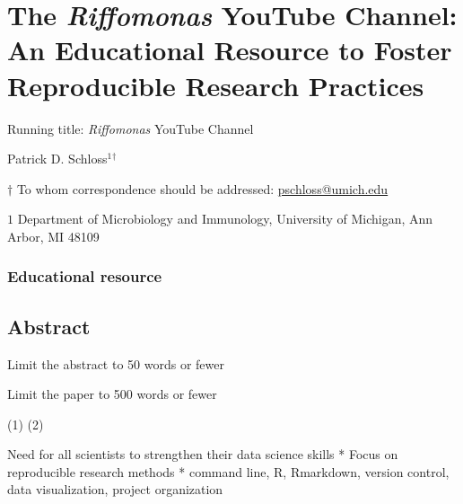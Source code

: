 \documentclass[
]{article}
\author{}
\date{\vspace{-2.5em}}
\begin{document}
\vspace*{10mm}

\hypertarget{the-riffomonas-youtube-channel-an-educational-resource-to-foster-reproducible-research-practices}{%
\section{\texorpdfstring{The \emph{Riffomonas} YouTube Channel: An
Educational Resource to Foster Reproducible Research
Practices}{The Riffomonas YouTube Channel: An Educational Resource to Foster Reproducible Research Practices}}\label{the-riffomonas-youtube-channel-an-educational-resource-to-foster-reproducible-research-practices}}

\vspace{15mm}

Running title: \emph{Riffomonas} YouTube Channel

\vspace{15mm}

Patrick D. Schloss\({^1}\)\({^\dagger}\)

\vspace{40mm}

\(\dagger\) To whom correspondence should be addressed:
\href{mailto:pschloss@umich.edu}{pschloss@umich.edu}

\(1\) Department of Microbiology and Immunology, University of Michigan,
Ann Arbor, MI 48109

\vspace{35mm}

\hypertarget{educational-resource}{%
\subsubsection{Educational resource}\label{educational-resource}}

\newpage
\linenumbers

\hypertarget{abstract}{%
\subsection{Abstract}\label{abstract}}

Limit the abstract to 50 words or fewer

\newpage

Limit the paper to 500 words or fewer

(1) (2)

Need for all scientists to strengthen their data science skills * Focus
on reproducible research methods * command line, R, Rmarkdown, version
control, data visualization, project organization
\end{document}
